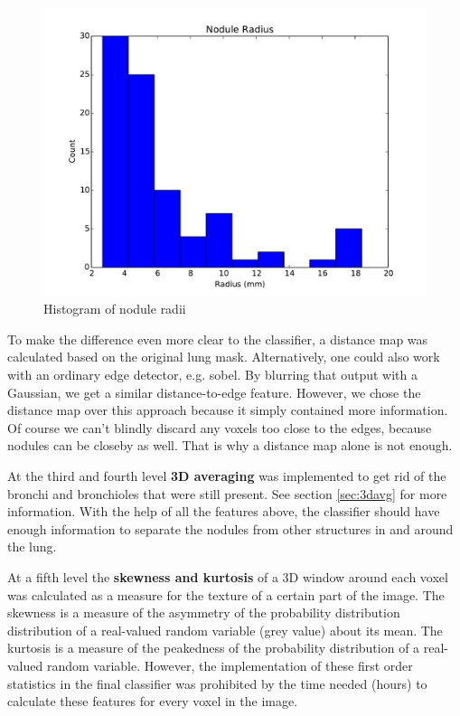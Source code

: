 \begin{figure}[htp]
\begin{center}
  \includegraphics[width=\linewidth]{img/MaxNoduleRadii.pdf}
  \caption{Histogram of nodule radii}
  \label{fig:radii}
\end{center}
\end{figure}

To make the difference even more clear to the classifier, a distance map was
calculated based on the original lung mask. Alternatively, one could also work
with an ordinary edge detector, e.g. sobel. By blurring that output with a
Gaussian, we get a similar distance-to-edge feature. However, we chose the
distance map over this approach because it simply contained more information. Of
course we can't blindly discard any voxels too close to the edges, because
nodules can be closeby as well. That is why a distance map alone is not enough.


At the third and fourth level \textbf{3D averaging} was implemented to get rid
of the bronchi and bronchioles that were still present. See section
\ref{sec:3davg} for more information. With the help of all the features above,
the classifier should have enough information to separate the nodules from other
structures in and around the lung.

At a fifth level the \textbf{skewness and kurtosis} of a 3D window around each
voxel was calculated as a measure for the texture of a certain part of the image. The
skewness is a measure of the asymmetry of the probability distribution
distribution of a real-valued random variable (grey value) about its mean. The
kurtosis is a measure of the peakedness of the probability distribution of a
real-valued random variable. However, the implementation of these first order
statistics in the final classifier was prohibited by the time needed (hours) to
calculate these features for every voxel in the image.

